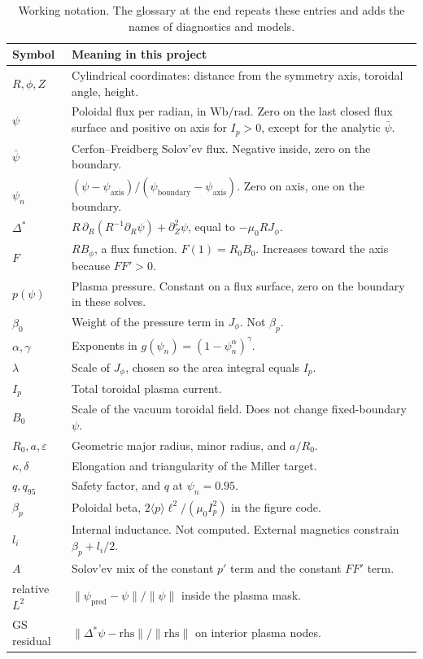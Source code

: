 \documentclass[11pt,a4paper,oneside,openany]{book}
\numberwithin{equation}{chapter}
\newcommand{\Dstar}{\Delta^{*}}
\newcommand{\psin}{\psi_{n}}
\newcommand{\psibar}{\bar{\psi}}
\newcommand{\Ip}{I_{p}}
\theoremstyle{definition}
\begin{document}
\begin{table}[htbp]
\centering
\caption{Working notation. The glossary at the end repeats these entries and adds the names of diagnostics and models.}
\label{tab:notation}
\small
\begin{tabularx}{\textwidth}{@{}l Y@{}}
\toprule
Symbol & Meaning in this project \\
\midrule
\(R,\phi,Z\) & Cylindrical coordinates: distance from the symmetry axis, toroidal angle, height. \\
\(\psi\) & Poloidal flux per radian, in \(\mathrm{Wb/rad}\). Zero on the last closed flux surface and positive on axis for \(\Ip>0\), except for the analytic \(\psibar\). \\
\(\psibar\) & Cerfon--Freidberg Solov'ev flux. Negative inside, zero on the boundary. \\
\(\psin\) & \((\psi-\psi_{\mathrm{axis}})/(\psi_{\mathrm{boundary}}-\psi_{\mathrm{axis}})\). Zero on axis, one on the boundary. \\
\(\Dstar\) & \(R\,\partial_{R}(R^{-1}\partial_{R}\psi)+\partial_{Z}^{2}\psi\), equal to \(-\mu_{0} R J_{\phi}\). \\
\(F\) & \(R B_{\phi}\), a flux function. \(F(1)=R_{0} B_{0}\). Increases toward the axis because \(FF'>0\). \\
\(p(\psi)\) & Plasma pressure. Constant on a flux surface, zero on the boundary in these solves. \\
\(\beta_{0}\) & Weight of the pressure term in \(J_{\phi}\). Not \(\beta_{p}\). \\
\(\alpha,\gamma\) & Exponents in \(g(\psin)=(1-\psin^{\alpha})^{\gamma}\). \\
\(\lambda\) & Scale of \(J_{\phi}\), chosen so the area integral equals \(\Ip\). \\
\(\Ip\) & Total toroidal plasma current. \\
\(B_{0}\) & Scale of the vacuum toroidal field. Does not change fixed-boundary \(\psi\). \\
\(R_{0},a,\varepsilon\) & Geometric major radius, minor radius, and \(a/R_{0}\). \\
\(\kappa,\delta\) & Elongation and triangularity of the Miller target. \\
\(q,q_{95}\) & Safety factor, and \(q\) at \(\psin=0.95\). \\
\(\beta_{p}\) & Poloidal beta, \(2\langle p\rangle \ell^{2}/(\mu_{0}\Ip^{2})\) in the figure code. \\
\(l_{i}\) & Internal inductance. Not computed. External magnetics constrain \(\beta_{p}+l_{i}/2\). \\
\(A\) & Solov'ev mix of the constant \(p'\) term and the constant \(FF'\) term. \\
relative \(L^{2}\) & \(\lVert\psi_{\mathrm{pred}}-\psi\rVert/\lVert\psi\rVert\) inside the plasma mask. \\
GS residual & \(\lVert\Dstar\psi-\mathrm{rhs}\rVert/\lVert\mathrm{rhs}\rVert\) on interior plasma nodes. \\
\bottomrule
\end{tabularx}
\end{table}
\end{document}
